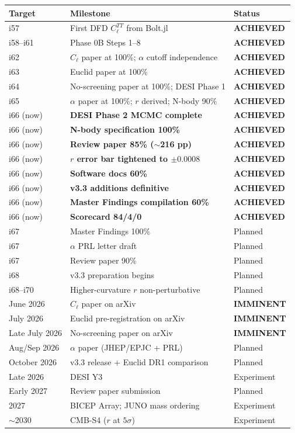 \documentclass[11pt,a4paper]{article}
\begin{document}
\begin{center}
\begin{longtable}{lll}
\toprule
\textbf{Target} & \textbf{Milestone} & \textbf{Status} \\
\midrule
i57 & First DFD $C_\ell^{TT}$ from Bolt.jl & \textbf{ACHIEVED} \\
i58--i61 & Phase 0B Steps 1--8 & \textbf{ACHIEVED} \\
i62 & $C_\ell$ paper at 100\%; $\alpha$ cutoff independence & \textbf{ACHIEVED} \\
i63 & Euclid paper at 100\% & \textbf{ACHIEVED} \\
i64 & No-screening paper at 100\%; DESI Phase 1 & \textbf{ACHIEVED} \\
i65 & $\alpha$ paper at 100\%; $r$ derived; N-body 90\% & \textbf{ACHIEVED} \\
i66 (now) & \textbf{DESI Phase 2 MCMC complete} & \textbf{ACHIEVED} \\
i66 (now) & \textbf{N-body specification 100\%} & \textbf{ACHIEVED} \\
i66 (now) & \textbf{Review paper 85\% ($\sim$216 pp)} & \textbf{ACHIEVED} \\
i66 (now) & \textbf{$r$ error bar tightened to $\pm 0.0008$} & \textbf{ACHIEVED} \\
i66 (now) & \textbf{Software docs 60\%} & \textbf{ACHIEVED} \\
i66 (now) & \textbf{v3.3 additions definitive} & \textbf{ACHIEVED} \\
i66 (now) & \textbf{Master Findings compilation 60\%} & \textbf{ACHIEVED} \\
i66 (now) & \textbf{Scorecard 84/4/0} & \textbf{ACHIEVED} \\
\midrule
i67 & Master Findings 100\% & Planned \\
i67 & $\alpha$ PRL letter draft & Planned \\
i67 & Review paper 90\% & Planned \\
i68 & v3.3 preparation begins & Planned \\
i68--i70 & Higher-curvature $r$ non-perturbative & Planned \\
\midrule
June 2026 & $C_\ell$ paper on arXiv & \textbf{IMMINENT} \\
July 2026 & Euclid pre-registration on arXiv & \textbf{IMMINENT} \\
Late July 2026 & No-screening paper on arXiv & \textbf{IMMINENT} \\
Aug/Sep 2026 & $\alpha$ paper (JHEP/EPJC + PRL) & Planned \\
October 2026 & v3.3 release + Euclid DR1 comparison & Planned \\
Late 2026 & DESI Y3 & Experiment \\
Early 2027 & Review paper submission & Planned \\
2027 & BICEP Array; JUNO mass ordering & Experiment \\
$\sim$2030 & CMB-S4 ($r$ at $5\sigma$) & Experiment \\
\bottomrule
\end{longtable}
\end{center}
\end{document}
